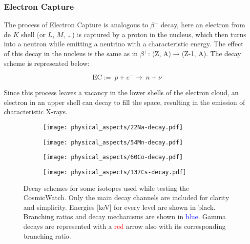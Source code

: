 \subsubsection{Electron Capture}

The process of Electron Capture is analogous to $\beta^+$ decay, here an electron from de $K$ shell (or $L$, $M$, \dots) is captured by a proton in the nucleus, which then turns into a neutron while emitting a neutrino with a characteristic energy. The effect of this decay in the nucleus is the same as in $\beta^+$: (Z, A)$\rightarrow$(Z-1, A). The decay scheme is represented below:

\begin{equation}
  \text{EC} :=~ p + e^- \rightarrow ~ n + \nu
\end{equation}

Since this process leaves a vacancy in the lower shells of the electron cloud, an electron in an upper shell can decay to fill the space, resulting in the emission of characteristic X-rays.

\begin{figure}
  \centering
  \begin{subfigure}[t]{0.425\textwidth}
    \texttt{[image: physical\_aspects/22Na-decay.pdf]}
    \caption{\label{sfig:22Na}}
  \end{subfigure}
  \begin{subfigure}[t]{0.425\textwidth}
    \texttt{[image: physical\_aspects/54Mn-decay.pdf]}
    \caption{\label{sfig:54Mn}}
  \end{subfigure}
  \medskip
  \centering
  \begin{subfigure}[t]{0.425\textwidth}
    \texttt{[image: physical\_aspects/60Co-decay.pdf]}
    \caption{\label{sfig:60Co}}
  \end{subfigure}
  \begin{subfigure}[t]{0.425\textwidth}
    \texttt{[image: physical\_aspects/137Cs-decay.pdf]}
    \caption{\label{sfig:137Cs}}
  \end{subfigure}
  \caption{\label{fig:decay_schemes}Decay schemes for some isotopes used while testing the CosmicWatch. Only the main decay channels are included for clarity and simplicity. Energies [\unit{\kilo\eV}] for every level are shown in black. Branching ratios and decay mechanisms are shown in \textcolor{blue}{blue}. Gamma decays are represented with a \textcolor{red}{red} arrow also with its corresponding branching ratio.}
\end{figure}

